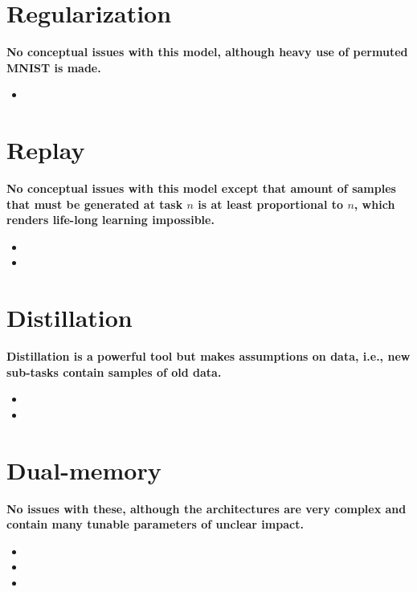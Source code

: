 \documentclass{article}
\begin{document}
\section{Regularization}
\textbf{No conceptual issues with this model, although heavy use of permuted MNIST is made.}
\begin{itemize}
\item {}
\end{itemize}

\section{Replay}
\textbf{No conceptual issues with this model except that amount of samples that must be generated at task $n$ is at least proportional to $n$, which renders life-long learning impossible.}
\begin{itemize}
\item {}
\item {}
\end{itemize}

\section{Distillation}
\textbf{Distillation is a powerful tool but makes assumptions on data, i.e., new sub-tasks contain samples of old data.}
\begin{itemize}
\item {}
\item {}
\end{itemize}

\section{Dual-memory}
\textbf{No issues with these, although the architectures are very complex and contain many tunable parameters of unclear impact.}
\begin{itemize}
\item {}
\item {}
\item {}
\end{itemize}

\nocite{*}

\clearpage


\end{document}
